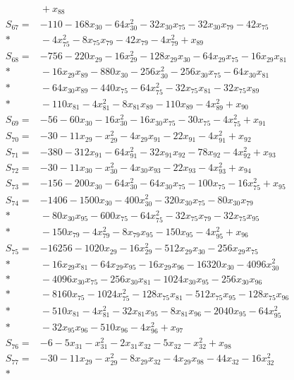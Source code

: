 \begin{align*}
&{}+x_{88}\\[3pt]
S_{67}={}&-110-168x_{30}-64x_{30}^{2}-32x_{30}x_{75}-32x_{30}x_{79}-42x_{75}\\*
&{}-4x_{75}^{2}-8x_{75}x_{79}-42x_{79}-4x_{79}^{2}+x_{89}\\[3pt]
S_{68}={}&-756-220x_{29}-16x_{29}^{2}-128x_{29}x_{30}-64x_{29}x_{75}-16x_{29}x_{81}\\*
&{}-16x_{29}x_{89}-880x_{30}-256x_{30}^{2}-256x_{30}x_{75}-64x_{30}x_{81}\\*
&{}-64x_{30}x_{89}-440x_{75}-64x_{75}^{2}-32x_{75}x_{81}-32x_{75}x_{89}\\*
&{}-110x_{81}-4x_{81}^{2}-8x_{81}x_{89}-110x_{89}-4x_{89}^{2}+x_{90}\\[3pt]
S_{69}={}&-56-60x_{30}-16x_{30}^{2}-16x_{30}x_{75}-30x_{75}-4x_{75}^{2}+x_{91}\\[3pt]
S_{70}={}&-30-11x_{29}-x_{29}^{2}-4x_{29}x_{91}-22x_{91}-4x_{91}^{2}+x_{92}\\[3pt]
S_{71}={}&-380-312x_{91}-64x_{91}^{2}-32x_{91}x_{92}-78x_{92}-4x_{92}^{2}+x_{93}\\[3pt]
S_{72}={}&-30-11x_{30}-x_{30}^{2}-4x_{30}x_{93}-22x_{93}-4x_{93}^{2}+x_{94}\\[3pt]
S_{73}={}&-156-200x_{30}-64x_{30}^{2}-64x_{30}x_{75}-100x_{75}-16x_{75}^{2}+x_{95}\\[3pt]
S_{74}={}&-1406-1500x_{30}-400x_{30}^{2}-320x_{30}x_{75}-80x_{30}x_{79}\\*
&{}-80x_{30}x_{95}-600x_{75}-64x_{75}^{2}-32x_{75}x_{79}-32x_{75}x_{95}\\*
&{}-150x_{79}-4x_{79}^{2}-8x_{79}x_{95}-150x_{95}-4x_{95}^{2}+x_{96}\\[3pt]
S_{75}={}&-16256-1020x_{29}-16x_{29}^{2}-512x_{29}x_{30}-256x_{29}x_{75}\\*
&{}-16x_{29}x_{81}-64x_{29}x_{95}-16x_{29}x_{96}-16320x_{30}-4096x_{30}^{2}\\*
&{}-4096x_{30}x_{75}-256x_{30}x_{81}-1024x_{30}x_{95}-256x_{30}x_{96}\\*
&{}-8160x_{75}-1024x_{75}^{2}-128x_{75}x_{81}-512x_{75}x_{95}-128x_{75}x_{96}\\*
&{}-510x_{81}-4x_{81}^{2}-32x_{81}x_{95}-8x_{81}x_{96}-2040x_{95}-64x_{95}^{2}\\*
&{}-32x_{95}x_{96}-510x_{96}-4x_{96}^{2}+x_{97}\\[3pt]
S_{76}={}&-6-5x_{31}-x_{31}^{2}-2x_{31}x_{32}-5x_{32}-x_{32}^{2}+x_{98}\\[3pt]
S_{77}={}&-30-11x_{29}-x_{29}^{2}-8x_{29}x_{32}-4x_{29}x_{98}-44x_{32}-16x_{32}^{2}\\*

\end{align*}
